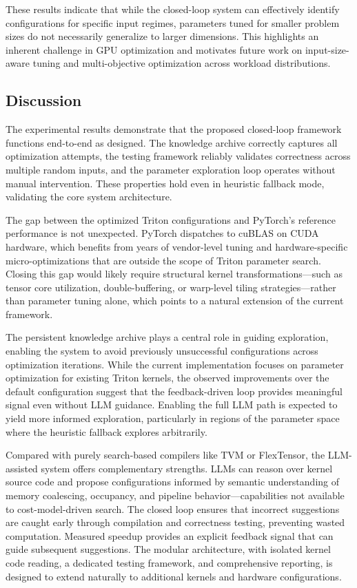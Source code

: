 \documentclass{article}
\begin{document}
These results indicate that while the closed-loop system can effectively identify configurations for specific input regimes, parameters tuned for smaller problem sizes do not necessarily generalize to larger dimensions. This highlights an inherent challenge in GPU optimization and motivates future work on input-size-aware tuning and multi-objective optimization across workload distributions.

\subsection{Discussion}

The experimental results demonstrate that the proposed closed-loop framework functions end-to-end as designed. The knowledge archive correctly captures all optimization attempts, the testing framework reliably validates correctness across multiple random inputs, and the parameter exploration loop operates without manual intervention. These properties hold even in heuristic fallback mode, validating the core system architecture.

The gap between the optimized Triton configurations and PyTorch's reference performance is not unexpected. PyTorch dispatches to cuBLAS on CUDA hardware, which benefits from years of vendor-level tuning and hardware-specific micro-optimizations that are outside the scope of Triton parameter search. Closing this gap would likely require structural kernel transformations—such as tensor core utilization, double-buffering, or warp-level tiling strategies—rather than parameter tuning alone, which points to a natural extension of the current framework.

The persistent knowledge archive plays a central role in guiding exploration, enabling the system to avoid previously unsuccessful configurations across optimization iterations. While the current implementation focuses on parameter optimization for existing Triton kernels, the observed improvements over the default configuration suggest that the feedback-driven loop provides meaningful signal even without LLM guidance. Enabling the full LLM path is expected to yield more informed exploration, particularly in regions of the parameter space where the heuristic fallback explores arbitrarily.\newline

Compared with purely search-based compilers like TVM or FlexTensor, the LLM-assisted system offers complementary strengths. LLMs can reason over kernel source code and propose configurations informed by semantic understanding of memory coalescing, occupancy, and pipeline behavior—capabilities not available to cost-model-driven search. The closed loop ensures that incorrect suggestions are caught early through compilation and correctness testing, preventing wasted computation. Measured speedup provides an explicit feedback signal that can guide subsequent suggestions. The modular architecture, with isolated kernel code reading, a dedicated testing framework, and comprehensive reporting, is designed to extend naturally to additional kernels and hardware configurations.
\end{document}
